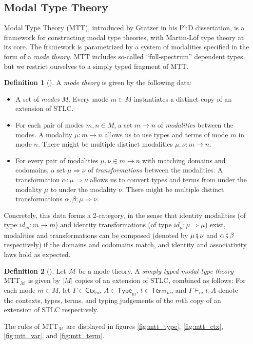 \documentclass{scrartcl}
\theoremstyle{definition}
\newtheorem{definition}{Definition}
\theoremstyle{plain}
\newcommand{\MTTM}{MTT${}_{\mathcal{M}}$}
\begin{document}
\subsection{Modal Type Theory}
Modal Type Theory (MTT)\cite{gratzer2023syntax}, introduced by Gratzer in his
PhD dissertation, is a framework for constructing modal type theories, with
Martin-L\"{of} type theory at its core. The framework is parametrized by a
system of modalities specified in the form of a \emph{mode theory}. MTT
includes so-called ``full-spectrum'' dependent types, but we restrict ourselves
to a simply typed fragment of MTT.
\begin{definition}[{\cite[Chapter 6.1.1]{gratzer2023syntax}}]
  A \emph{mode theory} is given by the following data:
  \begin{itemize}
  \item
    A set of \emph{modes} $M$. Every mode $m \in M$ instantiates a distinct
    copy of an extension of STLC.
  \item
    For each pair of modes $m, n \in M$, a set $m \to n$ of \emph{modalities}
    between the modes. A modality $\mu : m \to n$ allows us to use types and
    terms of mode $m$ in mode $n$. There might be multiple distinct modalities
    $\mu , \nu : m \to n$.
  \item
    For every pair of modalities $\mu, \nu \in m \to n$ with matching domains
    and codomains, a set $\mu \Rightarrow \nu$ of \emph{transformations}
    between the modalities. A transformation $\alpha : \mu \Rightarrow \nu$
    allows us to convert types and terms from under the modality $\mu$ to under
    the modality $\nu$. There might be multiple distinct transformations
    $\alpha, \beta : \mu \Rightarrow \nu$.
  \end{itemize}
  Concretely, this data forms a 2-category, in the sense that identity
  modalities (of type $id_m : m \to m$) and identity transformations (of type
  $id_\mu : \mu \Rightarrow \mu $) exist, modalities and transformations can be
  composed (denoted by $\mu \fatsemi \nu$ and $\alpha \fatsemi \beta$
  respectively) if the domains and codomains match, and identity and
  associativity laws hold as expected\cite{licata2016adjoint}.
\end{definition}

\begin{definition}[{\cite[following Chapter 6.2]{gratzer2023syntax}}]
  Let $\mathcal{M}$ be a mode theory. A \emph{simply typed modal type theory}
  \MTTM{} is given by $|M|$ copies of an extension of STLC, combined as
  follows: For each mode $m \in M$, let $\Gamma\in\textsf{Ctx}_m$, $A \in
  \textsf{Type}_m$, $t \in \textsf{Term}_m$, and $\Gamma \vdash_m t : A$ denote
  the contexts, types, terms, and typing judgements of the $m$th copy of an
  extension of STLC respectively.
  
  The rules of \MTTM{} are displayed in figures \ref{fig:mtt_type},
  \ref{fig:mtt_ctx}, \ref{fig:mtt_var}, and \ref{fig:mtt_term}.
\end{definition}
\end{document}
